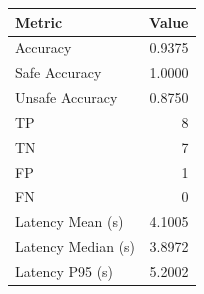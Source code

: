 \begin{table}[ht]
\centering
\begin{tabular}{lr}
\toprule
Metric & Value \\
\midrule
Accuracy & 0.9375 \\
Safe Accuracy & 1.0000 \\
Unsafe Accuracy & 0.8750 \\
TP & 8 \\
TN & 7 \\
FP & 1 \\
FN & 0 \\
Latency Mean (s) & 4.1005 \\
Latency Median (s) & 3.8972 \\
Latency P95 (s) & 5.2002 \\
\bottomrule
\end{tabular}
\end{table}